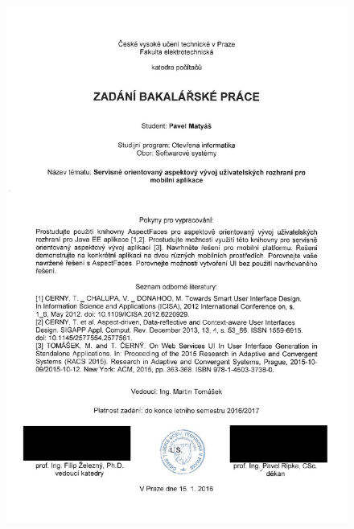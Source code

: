 \documentclass[11pt,twoside,a4paper]{book}
\begin{document}
	 
	\translate				%

	{
	 \cleardoublepage \thispagestyle{empty}
	\begin{figure}
	\begin{center}
	\includegraphics[width=\textwidth, height=\textheight]{figures/zadani}
	\end{center}
	\end{figure}
	\newpage
	}
\end{document}
